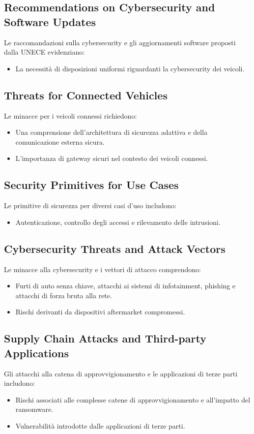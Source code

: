 \subsection{Recommendations on Cybersecurity and Software Updates} Le
raccomandazioni sulla cybersecurity e gli aggiornamenti software proposti dalla
UNECE evidenziano: \begin{itemize} \item La necessità di disposizioni uniformi
riguardanti la cybersecurity dei veicoli. \end{itemize}

\subsection{Threats for Connected Vehicles} Le minacce per i veicoli connessi
richiedono: \begin{itemize} \item Una comprensione dell'architettura di
sicurezza adattiva e della comunicazione esterna sicura. \item L'importanza di
gateway sicuri nel contesto dei veicoli connessi. \end{itemize}

\subsection{Security Primitives for Use Cases} Le primitive di sicurezza per
diversi casi d'uso includono: \begin{itemize} \item Autenticazione, controllo
degli accessi e rilevamento delle intrusioni. \end{itemize}

\subsection{Cybersecurity Threats and Attack Vectors} Le minacce alla
cybersecurity e i vettori di attacco comprendono: \begin{itemize} \item Furti di
auto senza chiave, attacchi ai sistemi di infotainment, phishing e attacchi di
forza bruta alla rete. \item Rischi derivanti da dispositivi aftermarket
compromessi. \end{itemize}

\subsection{Supply Chain Attacks and Third-party Applications} Gli attacchi alla
catena di approvvigionamento e le applicazioni di terze parti includono:
\begin{itemize} \item Rischi associati alle complesse catene di
approvvigionamento e all'impatto del ransomware. \item Vulnerabilità introdotte
dalle applicazioni di terze parti. \end{itemize}

